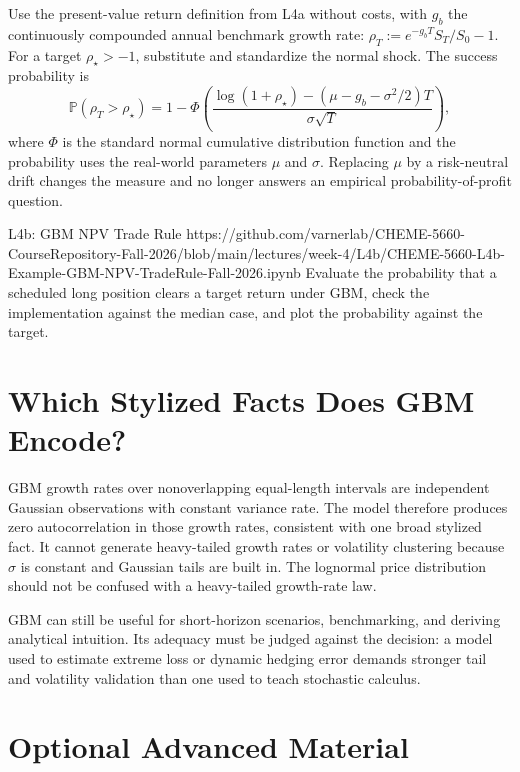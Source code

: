 \documentclass[11pt]{article}
\newcommand{\PhiCDF}{\Phi}
\newcommand{\Pmeasure}{\mathbb{P}}
\begin{document}
Use the present-value return definition from L4a without costs, with $g_b$ the continuously compounded annual benchmark growth rate: $\rho_T:=e^{-g_bT}S_T/S_0-1$. For a target $\rho_\star>-1$, substitute  and standardize the normal shock. The success probability is
\begin{equation}
  \label{eq:gbm-pop}
  \Pmeasure(\rho_T>\rho_\star)
  =1-\PhiCDF\!\left(
  \frac{\log(1+\rho_\star)-
  (\mu-g_b-\sigma^2/2)T}{\sigma\sqrt{T}}
  \right),
\end{equation}
where $\PhiCDF$ is the standard normal cumulative distribution function and the probability uses the real-world parameters $\mu$ and $\sigma$. Replacing $\mu$ by a risk-neutral drift changes the measure and no longer answers an empirical probability-of-profit question.

\notebooklink
  {L4b: GBM NPV Trade Rule}
  {https://github.com/varnerlab/CHEME-5660-CourseRepository-Fall-2026/blob/main/lectures/week-4/L4b/CHEME-5660-L4b-Example-GBM-NPV-TradeRule-Fall-2026.ipynb}
  {Evaluate the probability that a scheduled long position clears a target return under GBM, check the implementation against the median case, and plot the probability against the target.}

\section{Which Stylized Facts Does GBM Encode?}

GBM growth rates over nonoverlapping equal-length intervals are independent Gaussian observations with constant variance rate. The model therefore produces zero autocorrelation in those growth rates, consistent with one broad stylized fact. It cannot generate heavy-tailed growth rates or volatility clustering because $\sigma$ is constant and Gaussian tails are built in. The lognormal price distribution should not be confused with a heavy-tailed growth-rate law.

GBM can still be useful for short-horizon scenarios, benchmarking, and deriving analytical intuition. Its adequacy must be judged against the decision: a model used to estimate extreme loss or dynamic hedging error demands stronger tail and volatility validation than one used to teach stochastic calculus.

\newpage
\section*{Optional Advanced Material}
\end{document}
